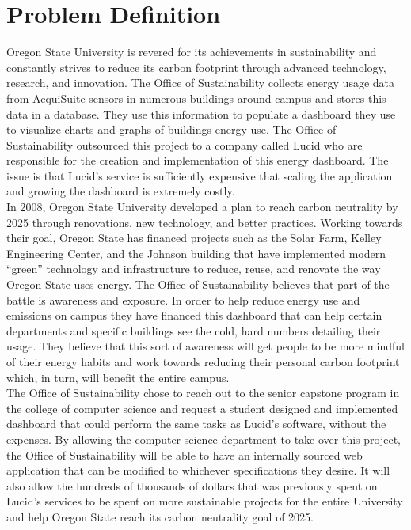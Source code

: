 \documentclass[onecolumn, draftclsnofoot,10pt, compsoc]{IEEEtran}
\begin{document}
  \newpage
  \tableofcontents
  \clearpage
  
  \section{Problem Definition}
  Oregon State University is revered for its achievements in sustainability and constantly strives to reduce its carbon footprint through advanced technology, research, and innovation. The Office of Sustainability collects energy usage data from AcquiSuite sensors in numerous buildings around campus and stores this data in a database. They use this information to populate a dashboard they use to visualize charts and graphs of buildings energy use. The Office of Sustainability outsourced this project to a company called Lucid who are responsible for the creation and implementation of this energy dashboard. The issue is that Lucid's service is sufficiently expensive that scaling the application and growing the dashboard is extremely costly.\\
  \indent In 2008, Oregon State University developed a plan to reach carbon neutrality by 2025 through renovations, new technology, and better practices. Working towards their goal, Oregon State has financed projects such as the Solar Farm, Kelley Engineering Center, and the Johnson building that have implemented modern “green” technology and infrastructure to reduce, reuse, and renovate the way Oregon State uses energy. The Office of Sustainability believes that part of the battle is awareness and exposure. In order to help reduce energy use and emissions on campus they have financed this dashboard that can help certain departments and specific buildings see the cold, hard numbers detailing their usage. They believe that this sort of awareness will get people to be more mindful of their energy habits and work towards reducing their personal carbon footprint which, in turn, will benefit the entire campus.\\
  \indent The Office of Sustainability chose to reach out to the senior capstone program in the college of computer science and request a student designed and implemented dashboard that could perform the same tasks as Lucid's software, without the expenses. By allowing the computer science department to take over this project, the Office of Sustainability will be able to have an internally sourced web application that can be modified to whichever specifications they desire. It will also allow the hundreds of thousands of dollars that was previously spent on Lucid's services to be spent on more sustainable projects for the entire University and help Oregon State reach its carbon neutrality goal of 2025.
  
\end{document}
